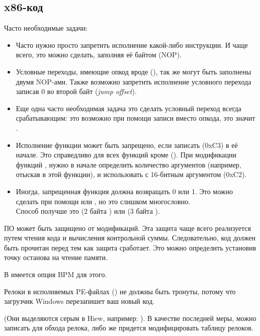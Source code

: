 \label{patching}

\subsection{x86-код}
\label{x86_patching}

Часто необходимые задачи:

\begin{itemize}

\item Часто нужно просто запретить исполнение какой-либо инструкции.
И чаще всего, это можно сделать, заполняя её байтом 
 (\ac{NOP}).

\item Условные переходы, имеющие опкод вроде  (\JZ), 
так же могут быть заполнены двумя \ac{NOP}-ами.
Также возможно запретить исполнение условного перехода записав 0 во второй байт (\emph{jump offset}).

\item Еще одна часто необходимая задача это сделать условный переход всегда срабатывающим: 
это возможно при помощи записи  
вместо опкода, это значит \JMP.

\item Исполнение функции может быть запрещено, если записать
\RETN (0xC3) в её начале.
Это справедливо для всех функций кроме  
().
При модификации функций , нужно в начале определить количество аргументов 
(например, отыскав \RETN в этой функции),
и использовать \RETN с 16-битным аргументом (0xC2).

\item Иногда, запрещенная функция должна возвращать 0 или 1.
Это можно сделать при помощи  или , 
но это слишком многословно.\\
Способ получше это  (2 байта ) или  (3 байта ).

\end{itemize}

ПО может быть защищено от модификаций.
Эта защита чаще всего реализуется путем чтения кода и вычисления контрольной суммы.
Следовательно, код должен быть прочитан перед тем как защита сработает.
Это можно определить установив точку останова на чтение памяти.

В \tracer имеется опция BPM для этого.

Релоки в исполняемых PE-файлах () 
не должны быть тронуты, потому что загрузчик Windows перезапишет ваш новый код.

(Они выделяются серым в Hiew, например: ).
В качестве последней меры, можно записать \JMP для обхода релока, либо же придется модифицировать таблицу
релоков.


